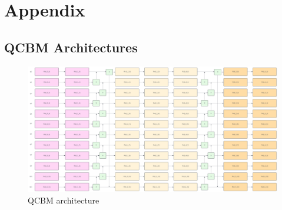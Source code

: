 \documentclass[12pt]{article}
\numberwithin{equation}{section}
\begin{document}
\clearpage
\section{Appendix}
\subsection{QCBM Architectures}

\begin{figure}[h!]
    \centering
    \includegraphics[scale=0.3, angle=270, width=\textwidth-209]{qcbm1.png}
    \caption{QCBM architecture}
\end{figure}
\clearpage


\printbibliography
\end{document}
